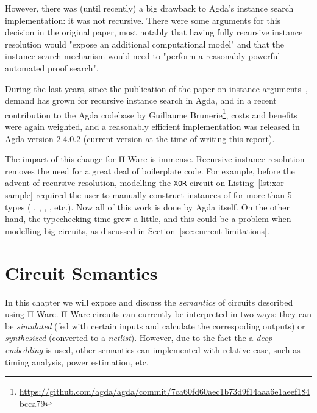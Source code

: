             However, there was (until recently) a big drawback to Agda's instance search implementation:
            it was not recursive.
            There were some arguments for this decision in the original paper,
            most notably that having fully recursive instance resolution would
            "expose an additional computational model" and that the instance search mechanism
            would need to "perform a reasonably powerful automated proof search".

            During the last years, since the publication of the paper on instance arguments~\cite{typeclasses-agda},
            demand has grown for recursive instance search in Agda, and in a recent contribution to the Agda codebase
            by Guillaume Brunerie\footnote{\url{https://github.com/agda/agda/commit/7ca60fd60aec1b73d9f14aaa6e1aeef184bcca79}},
            costs and benefits were again weighted, and a reasonably efficient implementation was released
            in Agda version 2.4.0.2 (current version at the time of writing this report).

            The impact of this change for Π-Ware is immense.
            Recursive instance resolution removes the need for a great deal of boilerplate code.
            For example, before the advent of recursive resolution, modelling the \texttt{XOR} circuit
            on Listing~\ref{lst:xor-sample} required the user to manually construct instances of 
            for more than 5 types
            (   
            , \AY{(}  \AY{)}  
            ,   \AY{(}  \AY{)}
            , \AY{(}  \AY{(}  \AY{)}\AY{)}  \AY{(}  \AY{)}
            , etc.).
            Now all of this work is done by Agda itself.
            On the other hand, the typechecking time grew a little,
            and this could be a problem when modelling big circuits, as discussed in Section~\ref{sec:current-limitations}.


    \section{Circuit Semantics}
    \label{sec:circuit-semantics}
        In this chapter we will expose and discuss the \emph{semantics} of circuits described using Π-Ware.
        Π-Ware circuits can currently be interpreted in two ways:
        they can be \emph{simulated} (fed with certain inputs and calculate the correspoding outputs)
        or \emph{synthesized} (converted to a \emph{netlist}).
        However, due to the fact the a \emph{deep embedding} is used, other semantics can implemented
        with relative ease, such as timing analysis, power estimation, etc.


